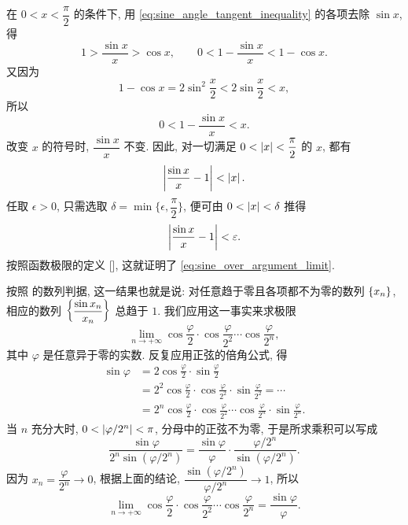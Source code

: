 在 $0<x<\dfrac\pi2$ 的条件下, 用
\eqref{eq:sine_angle_tangent_inequality} 的各项去除 $\sin x$, 得
$$
1>\frac{\sin x}{x}>\cos x,
\qquad
0<1-\frac{\sin x}{x}<1-\cos x.
$$
又因为
$$
1-\cos x=2\sin^2\frac x2<2\sin\frac x2<x,
$$
所以
$$
0<1-\frac{\sin x}{x}<x.
$$
改变 $x$ 的符号时, $\dfrac{\sin x}{x}$ 不变.
因此, 对一切满足 $0<\left| x \right|<\dfrac\pi2$ 的 $x$, 都有
$$
\left| \frac{\sin x}{x}-1 \right|<\left| x \right|.
$$
任取 $\epsilon>0$, 只需选取 $\delta=\min\{\epsilon,\dfrac\pi2\}$,
便可由 $0<\left| x \right|<\delta$ 推得
$$
\left| \frac{\sin x}{x}-1 \right|<\varepsilon.
$$
按照函数极限的定义 [], 这就证明了
\eqref{eq:sine_over_argument_limit}.

按照  的数列判据, 这一结果也就是说:
对任意趋于零且各项都不为零的数列 $\{x_{n}\}$,
相应的数列 $\left\{ \dfrac{\sin x_n}{x_n} \right\}$ 总趋于 $1$.
我们应用这一事实来求极限
$$
\lim_{n\to+\infty}\cos\frac\varphi2\cdot\cos\frac\varphi{2^2}
\cdots\cos\frac\varphi{2^n},
$$
其中 $\varphi$ 是任意异于零的实数. 反复应用正弦的倍角公式, 得
$$
\begin{aligned}
\sin\varphi
&=2\cos\frac\varphi2\cdot\sin\frac\varphi2\\
&=2^2\cos\frac\varphi2\cdot\cos\frac\varphi{2^2}
\cdot\sin\frac\varphi{2^2}=\cdots\\
&=2^n\cos\frac\varphi2\cdot\cos\frac\varphi{2^2}
\cdots\cos\frac\varphi{2^n}\cdot\sin\frac\varphi{2^n}.
\end{aligned}
$$
当 $n$ 充分大时, $0<\left| \varphi/2^n \right|<\pi$, 分母中的正弦不为零,
于是所求乘积可以写成
$$
\frac{\sin\varphi}{2^n\sin(\varphi/2^n)}
=\frac{\sin\varphi}{\varphi}\cdot
\frac{\varphi/2^n}{\sin(\varphi/2^n)}.
$$
因为 $x_n=\dfrac\varphi{2^n}\to0$, 根据上面的结论,
$\dfrac{\sin(\varphi/2^n)}{\varphi/2^n}\to1$, 所以
$$
\lim_{n\to+\infty}\cos\frac\varphi2\cdot\cos\frac\varphi{2^2}
\cdots\cos\frac\varphi{2^n}=\frac{\sin\varphi}{\varphi}.
$$

